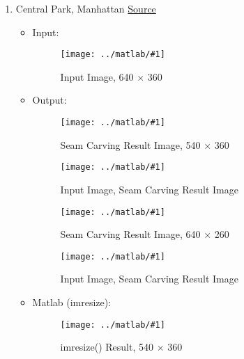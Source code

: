 \documentclass{article}
\newcommand{\listFigure}[3]{ \begin{figure}[H]
\texttt{[image: ../matlab/\#1]}
		\caption{#2\label{fig:#3}}
	\end{figure}		
}
\begin{document}
\begin{enumerate}
\begin{enumerate}
		In conclusion, Seam Carving displayed better performance while reducing the
		height than Matlab did (see Figure-\ref{fig:outputNorthKoreaMatlab}).
		\begin{itemize}
			\item Input:
			\listFigure{NorthKorea/inputNorthKorea.jpg}{Input Image, 532 $\times$
			354}{inputNorthKorea}
			\item Output:
			\listFigure{NorthKorea/outputNorthKoreaW.png}{Seam Carving Result Image, 432
			$\times$ 354}{outputNorthKoreaW} 
			\listFigure{NorthKorea/outputIOW.png}{Input Image, Seam Carving
			Result Image}{outputNorthKoreaIOW}
			\listFigure{NorthKorea/outputNorthKoreaH.png}{Seam Carving Result Image, 532
			$\times$ 254}{outputNorthKoreaH} 
			\listFigure{NorthKorea/outputIOH.png}{Input Image, Seam Carving
			Result Image}{outputNorthKoreaIOH}
			\item Matlab (imresize):
			\listFigure{NorthKorea/outputNorthKoreaMatlab.png}{imresize() Result, 432
			$\times$ 354}{outputNorthKoreaMatlab}
		\end{itemize}
		
		\item Central Park, Manhattan
		\href{http://animalnewyork.com/2013/awesome-map/}{Source} \\ 
		\begin{itemize}
			\item Input:
			\listFigure{Manhattan/inputManhattan.jpg}{Input Image, 640 $\times$
			360}{inputManhattan}
			\item Output:
			\listFigure{Manhattan/outputManhattanW.png}{Seam Carving Result Image, 540
			$\times$ 360}{outputManhattanW} 
			\listFigure{Manhattan/outputIOW.png}{Input Image, Seam Carving
			Result Image}{outputManhattanIOW}
			\listFigure{Manhattan/outputManhattanH.png}{Seam Carving Result Image, 640
			$\times$ 260}{outputManhattanH} 
			\listFigure{Manhattan/outputIOH.png}{Input Image, Seam Carving
			Result Image}{outputManhattanIOH}
			\item Matlab (imresize): 
			\listFigure{Manhattan/outputManhattanMatlab.png}{imresize() Result, 540
			$\times$ 360}{outputManhattanMatlab} 
		\end{itemize}
		

\end{enumerate}
\end{enumerate}
\end{document}
